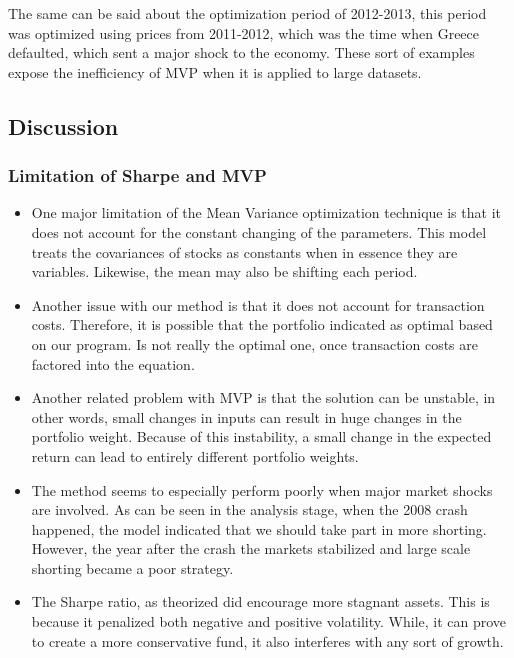 \documentclass[12pt,titlepage,letter]{article}
\begin{document}
	The same can be said about the optimization period of 2012-2013, this period was optimized using prices from 2011-2012, which was the time when Greece defaulted, which sent a major shock to the economy. These sort of examples expose the inefficiency of MVP when it is applied to large datasets.

	\subsection{Discussion}
		\subsubsection{Limitation of Sharpe and MVP}
			\begin{itemize}
				\item One major limitation of the Mean Variance optimization technique is that it does not account for the constant changing of the parameters. This model treats the covariances of stocks as constants when in essence they are variables. Likewise, the mean may also be shifting each period.

				\item Another issue with our method is that it does not account for transaction costs. Therefore, it is possible that the portfolio indicated as optimal based on our program. Is not really the optimal one, once transaction costs are factored into the equation.

				\item Another related problem with MVP is that the solution can be unstable, in other words, small changes in inputs can result in huge changes in the portfolio weight. Because of this instability, a small change in the expected return can lead to entirely different portfolio weights.

				\item The method seems to especially perform poorly when major market shocks are involved. As can be seen in the analysis stage, when the 2008 crash happened, the model indicated that we should take part in more shorting. However, the year after the crash the markets stabilized and large scale shorting became a poor strategy.

				\item The Sharpe ratio, as theorized did encourage more stagnant assets. This is because it penalized both negative and positive volatility. While, it can prove to create a more conservative fund, it also interferes with any sort of growth.
			\end{itemize}
\end{document}

